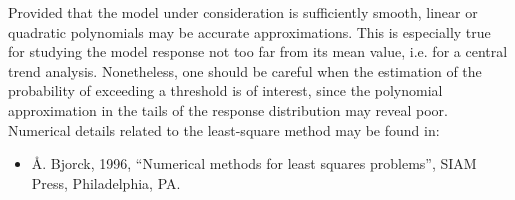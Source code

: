 {
  Provided that the model under consideration is sufficiently smooth, linear or quadratic polynomials may be accurate approximations. This is especially true for studying the model response not too far from its mean value, i.e. for a central trend analysis. Nonetheless, one should be careful when the estimation of the probability of exceeding a threshold is of interest, since the polynomial approximation in the tails of the response distribution may reveal poor. \\

  Numerical details related to the least-square method may be found in:
  \begin{itemize}
  \item {\AA}. Bjorck, 1996, ``Numerical methods for least squares problems'', SIAM Press, Philadelphia, PA.
  \end{itemize}
}
